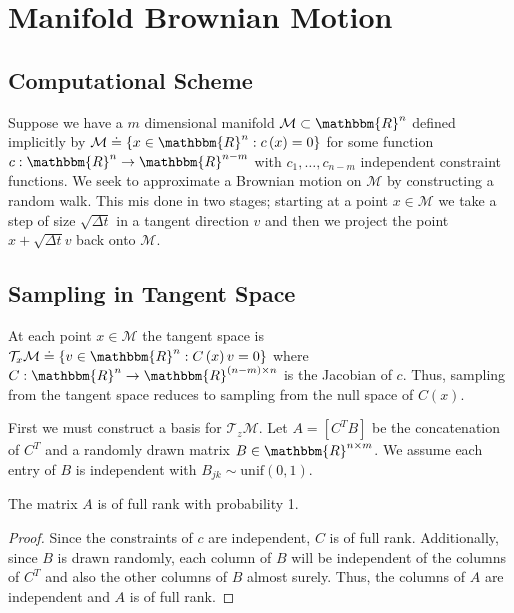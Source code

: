 %
\section{Manifold Brownian Motion}
\subsection{Computational Scheme}

Suppose we have a $m$ dimensional manifold $\mathcal{M} \subset \mathbbm{R}^n$ defined implicitly by $\mathcal{M} \doteq \left\{x \in \mathbbm{R}^n : c\left(x\right) = 0\right\}$ for some function $c: \mathbbm{R}^n \to \mathbbm{R}^{n-m}$ with $c_1,\dots,c_{n-m}$ independent constraint functions. We seek to approximate a Brownian motion on $\mathcal{M}$ by constructing a random walk. This mis done in two stages; starting at a point $x \in \mathcal{M}$ we take a step of size $\sqrt{\Delta t}$ in a tangent direction $v$ and then we project the point $x +\sqrt{\Delta t} v$ back onto $\mathcal{M}$. 

\subsection{Sampling in Tangent Space}  

At each point $x \in \mathcal{M}$ the tangent space is $\mathcal{T}_x\mathcal{M} \doteq \left\{v \in \mathbbm{R}^n : C\left(x\right)v = 0\right\}$ where $C: \mathbbm{R}^n \to \mathbbm{R}^{(n-m)\times n}$ is the Jacobian of $c$. Thus, sampling from the tangent space reduces to sampling from the null space of $C(x)$. 

First we must construct a basis for $\mathcal{T}_z\mathcal{M}$. Let $A = [C^T B]$ be the concatenation of $C^T$ and a randomly drawn matrix $B \in \mathbbm{R}^{n\times m}$. We assume each entry of $B$ is independent with $B_{jk} \sim  \text{unif}(0,1)$. 
\begin{mylem}
The matrix $A$ is of full rank with probability 1. 
\end{mylem}
\begin{proof}
Since the constraints of $c$ are independent, $C$ is of full rank. Additionally, since $B$ is drawn randomly, each column of $B$ will be independent of the columns of $C^T$  and also the other columns of $B$ almost surely. Thus, the columns of $A$ are independent and $A$ is of full rank. 
\end{proof}

